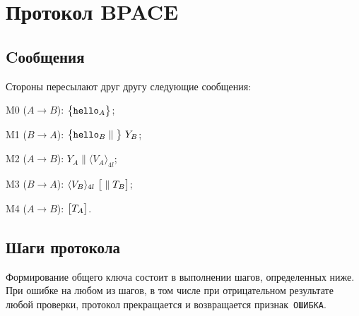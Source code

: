 \section{Протокол BPACE}\label{PACE}

\subsection{Cообщения}\label{PACE.Messages}

Стороны пересылают друг другу следующие сообщения:

M0 ($A\to B$): 
$\mathbf{\bigl\{}\texttt{hello}_A\mathbf{\bigr\}}$;

M1 ($B\to A$): 
$\mathimplicit{\hello_B\parallel}\ 
Y_B$;

M2 ($A\to B$): 
$Y_A\parallel\langle V_A\rangle_{4l}$;

M3 ($B\to A$): 
$\langle V_B\rangle_{4l}\ \mathoptional{\parallel T_B}$;

M4 ($A\to B$): 
$\mathbf{\bigl[}T_A\mathbf{\bigr]}$.

\subsection{Шаги протокола}\label{PACE.Steps}

Формирование общего ключа состоит в выполнении шагов,
определенных ниже. При ошибке на любом из шагов,
в том числе при отрицательном результате любой проверки, 
протокол прекращается и возвращается признак~\texttt{ОШИБКА}.

